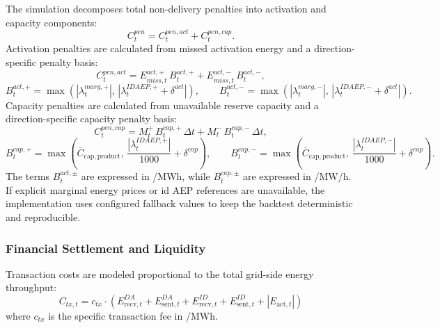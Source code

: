 The simulation decomposes total non-delivery penalties into activation and capacity components:
\begin{equation}\label{eq:cpen-total}
    C^{pen}_t=C^{pen,act}_t+C^{pen,cap}_t.
\end{equation}
Activation penalties are calculated from missed activation energy and a direction-specific penalty basis:
\begin{equation}\label{eq:cpen-act}
    C^{pen,act}_t
    =
    E^{act,+}_{miss,t}\,B^{act,+}_t
    +
    E^{act,-}_{miss,t}\,B^{act,-}_t,
\end{equation}
\begin{equation}\label{eq:cpen-act-basis}
    B^{act,+}_t=\max\!\left(|\lambda^{marg,+}_t|,\,|\lambda^{IDAEP,+}_t+\delta^{act}|\right),
    \qquad
    B^{act,-}_t=\max\!\left(|\lambda^{marg,-}_t|,\,|\lambda^{IDAEP,-}_t+\delta^{act}|\right).
\end{equation}
Capacity penalties are calculated from unavailable reserve capacity and a direction-specific capacity penalty basis:
\begin{equation}\label{eq:cpen-cap}
    C^{pen,cap}_t
    =
    M^{+}_{t}\,B^{cap,+}_t\,\Delta t
    +
    M^{-}_{t}\,B^{cap,-}_t\,\Delta t,
\end{equation}
\begin{equation}\label{eq:cpen-cap-basis}
    B^{cap,+}_t=\max\!\left(\overline{C}_{\mathrm{cap, product}},\,\frac{|\lambda^{IDAEP,+}_t|}{1000}+\delta^{cap}\right),
    \qquad
    B^{cap,-}_t=\max\!\left(\overline{C}_{\mathrm{cap, product}},\,\frac{|\lambda^{IDAEP,-}_t|}{1000}+\delta^{cap}\right).
\end{equation}
The terms $B^{act,\pm}_t$ are expressed in \texteuro/MWh, while $B^{cap,\pm}_t$ are expressed in \texteuro/MW/h. If explicit marginal energy prices or \gls{id} AEP references are unavailable, the implementation uses configured fallback values to keep the backtest deterministic and reproducible.

\subsubsection{Financial Settlement and Liquidity}
Transaction costs are modeled proportional to the total grid-side energy throughput:
\begin{equation}\label{eq:ctx}
    C_{tx,t} = c_{tx} \cdot \left( E^{DA}_{\mathrm{recv},t} + E^{DA}_{\mathrm{sent},t} + E^{ID}_{\mathrm{recv},t} + E^{ID}_{\mathrm{sent},t} + |E_{\text{act},t}| \right)
\end{equation}
where $c_{tx}$ is the specific transaction fee in \texteuro/MWh.

